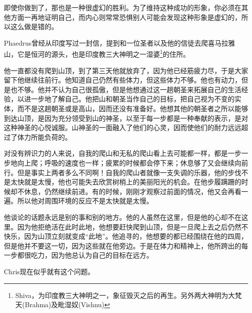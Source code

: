 \documentclass[UTF8]{article}
\begin{document}
\par 即使你做到了，那也是一种很虚幻的胜利。为了维持这种成功的形象，你必须在其他方面一再地证明自己，而内心则常常恐惧别人可能会发现这种形象是虚幻的，所以这么做是错的。
\par Phaedrus曾经从印度写过一封信，提到和一位圣者以及他的信徒去爬喜马拉雅山，它是恒河的源头，也是印度教三大神明之一湿婆\footnote{Shiva，为印度教三大神明之一，象征毁灭之后的再生。另外两大神明为大梵天(Brahma)及毗湿奴(Vishnu)}的住所。
\par 他一直都没有爬到山顶，到了第三天他就放弃了，因为他已经筋疲力尽，于是大家留下他继续往前行。他知道自己仍然有些体力，但这些体力不够。他也有动力，但是也不够。他并不认为自己很孤傲，但是他想通过这一趟朝圣来拓展自己的生活经验，以进一步地了解自己。他把山和朝圣当作自己的目标，把自己视为不变的实体，而不是这趟朝圣或是高山，因而还没有准备好。他想其他的朝圣者之所以能够到达山顶，是因为充分领受到山的神圣，以至于每一步都是一种奉献的表示，是对这种神圣的心悦诚服。山神圣的一面融入了他们的心灵，因而使他们的耐力远远超过了体力所能负荷的。
\par 对没有辨识力的人来说，自我的爬山和无私的爬山看上去可能都一样，都是一步一步地向上爬；呼吸的速度也一样；疲累的时候都会停下来；休息够了又会继续向前行。但是事实上两者多么不同啊！自我的爬山者就像一支失调的乐器，他的步伐不是太快就是太慢，他也可能失去欣赏树梢上的美丽阳光的机会。在他步履蹒跚的时候却不休息，仍然继续前进。有的时候，刚刚才观察过前面的情况，他又会再看一遍。所以他对周围环境的反应不是太快就是太慢。
\par 他谈论的话题永远是别的事和别的地方。他的人虽然在这里，但是他的心却不在这里。因为他拒绝活在此时此地，他想要赶快爬到山顶，但是一旦爬上去之后仍然不快乐，因为山顶立刻就变成“此地”。他追寻的，他想要的都已经围绕在他的四周，但是他并不要这一切，因为这些就在他旁边。于是在体力和精神上，他所跨出的每一步都很吃力，因为他总认为自己的目标在远方。
\par Chris现在似乎就有这个问题。
\end{document}
